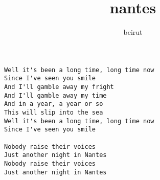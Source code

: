 \author{beirut}
\title{nantes}
\maketitle
\begin{verbatim}
Well it's been a long time, long time now
Since I've seen you smile
And I'll gamble away my fright
And I'll gamble away my time
And in a year, a year or so
This will slip into the sea
Well it's been a long time, long time now
Since I've seen you smile

Nobody raise their voices
Just another night in Nantes
Nobody raise their voices
Just another night in Nantes
\end{verbatim}